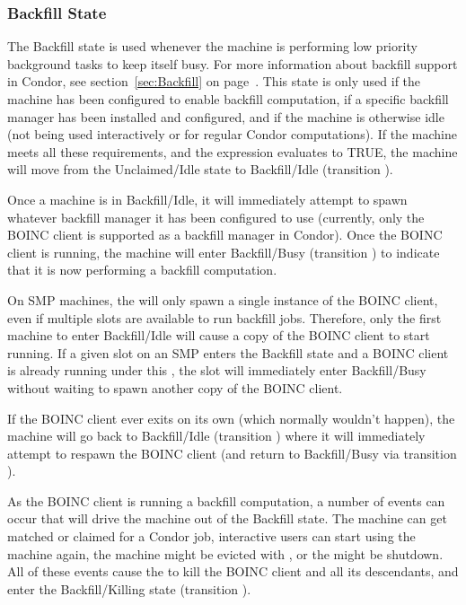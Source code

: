 \subsubsection{\label{sec:Backfill-State}Backfill State}

The Backfill state is used whenever the machine is performing low
priority background tasks to keep itself busy.
For more information about backfill support in Condor, see
section~\ref{sec:Backfill} on page~\pageref{sec:Backfill}.
This state is only used if the machine has been configured to enable
backfill computation, if a specific backfill manager has been
installed and configured, and if the machine is otherwise idle (not
being used interactively or for regular Condor computations).
If the machine meets all these requirements, and the
 expression evaluates to TRUE, the machine will
move from the Unclaimed/Idle state to Backfill/Idle (transition
).

Once a machine is in Backfill/Idle, it will immediately attempt to
spawn whatever backfill manager it has been configured to use
(currently, only the BOINC client is supported as a backfill manager
in Condor).
Once the BOINC client is running, the machine will enter
Backfill/Busy (transition ) to indicate that it is now
performing a backfill computation.

\Note On SMP machines, the  will only spawn a single
instance of the BOINC client, even if multiple slots are
available to run backfill jobs.
Therefore, only the first machine to enter Backfill/Idle will cause a
copy of the BOINC client to start running.
If a given slot on an SMP enters the Backfill state and a
BOINC client is already running under this , the
slot will immediately enter Backfill/Busy without waiting
to spawn another copy of the BOINC client.

If the BOINC client ever exits on its own (which normally wouldn't
happen), the machine will go back to Backfill/Idle (transition
) where it will immediately attempt to respawn the BOINC
client (and return to Backfill/Busy via transition ).

As the BOINC client is running a backfill computation, a number of
events can occur that will drive the machine out of the Backfill
state.
The machine can get matched or claimed for a Condor job, interactive
users can start using the machine again, the machine might be evicted
with , or the  might be shutdown.
All of these events cause the  to kill the BOINC client
and all its descendants, and enter the Backfill/Killing state
(transition ).

